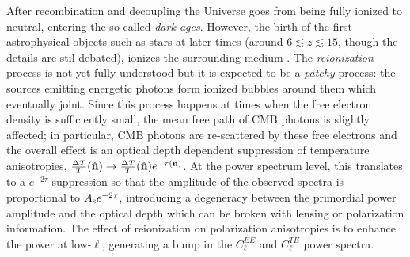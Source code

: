 After recombination and decoupling the Universe goes from being fully ionized to neutral, entering the 
so-called \emph{dark ages}. However, the birth of the first astrophysical objects such as stars at later 
times (around $6 \lesssim z \lesssim 15$, though the details are stil debated), ionizes the surrounding medium 
\citep{Gunn1965}. The \emph{reionization} process is not yet fully understood but it is expected to be  
a \emph{patchy} process: the sources emitting energetic photons form ionized bubbles around them
which eventually joint. Since this process happens at times when the free electron density is sufficiently 
small, the mean free path of \gls{CMB} photons is slightly affected; in particular, \gls{CMB} photons are 
re-scattered by these free electrons and the overall effect is an optical depth dependent suppression of 
temperature anisotropies, $\frac{\Delta T}{T}(\nver) \to \frac{\Delta T}{T}(\nver)e^{-\tau(\nver)}$. 
At the power spectrum level, this translates to a $e^{-2\tau}$ suppression so that the amplitude of the
observed spectra is proportional to $A_{\rm s}e^{-2\tau}$, introducing a degeneracy between the 
primordial power amplitude and the optical depth which can be broken with lensing or polarization 
information. The effect of reionization on polarization anisotropies is to enhance the power at low-$\ell$, 
generating a bump in the $C_{\ell}^{EE}$ and $C_{\ell}^{TE}$ power spectra.

